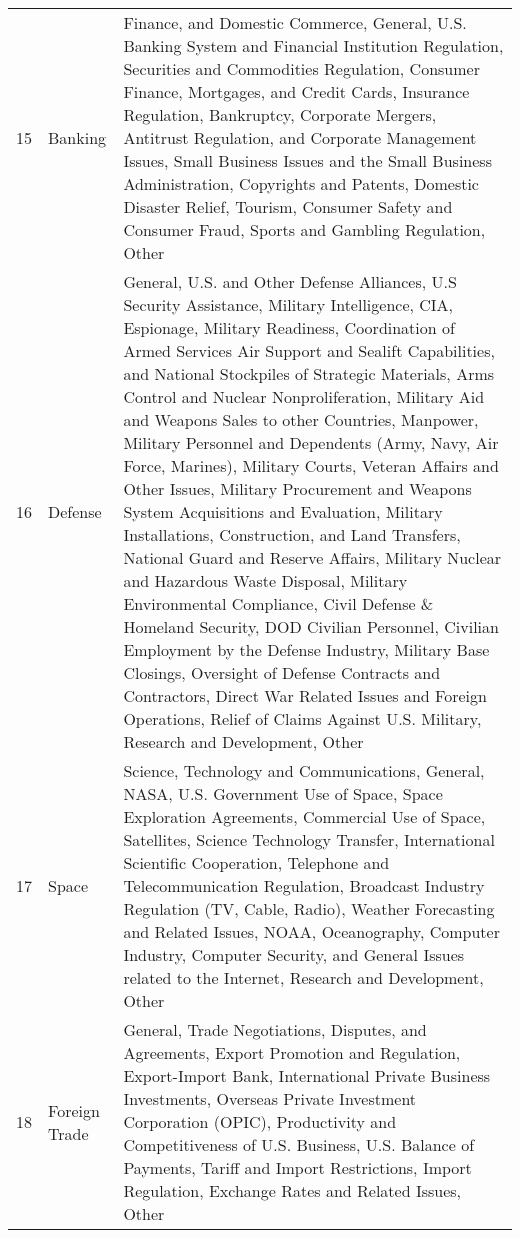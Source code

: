{\begin{longtable}{p{}p{}p{}}
  15 & Banking & Finance, and Domestic Commerce, General, U.S. Banking System and Financial Institution Regulation, Securities and Commodities Regulation, Consumer Finance, Mortgages, and Credit Cards, Insurance Regulation, Bankruptcy, Corporate Mergers, Antitrust Regulation, and Corporate Management Issues, Small Business Issues and the Small Business Administration, Copyrights and Patents, Domestic Disaster Relief, Tourism, Consumer Safety and Consumer Fraud, Sports and Gambling Regulation, Other \\ 
  16 & Defense & General, U.S. and Other Defense Alliances, U.S Security Assistance, Military Intelligence, CIA, Espionage, Military Readiness, Coordination of Armed Services Air Support and Sealift Capabilities, and National Stockpiles of Strategic Materials, Arms Control and Nuclear Nonproliferation, Military Aid and Weapons Sales to other Countries, Manpower, Military Personnel and Dependents (Army, Navy, Air Force, Marines), Military Courts, Veteran Affairs and Other Issues, Military Procurement and Weapons System Acquisitions and Evaluation, Military Installations, Construction, and Land Transfers, National Guard and Reserve Affairs, Military Nuclear and Hazardous Waste Disposal, Military Environmental Compliance, Civil Defense \& Homeland Security, DOD Civilian Personnel, Civilian Employment by the Defense Industry, Military Base Closings, Oversight of Defense Contracts and Contractors, Direct War Related Issues and Foreign Operations, Relief of Claims Against U.S. Military, Research and Development, Other \\ 
  17 & Space & Science, Technology and Communications, General, NASA, U.S. Government Use of Space, Space Exploration Agreements, Commercial Use of Space, Satellites, Science Technology Transfer, International Scientific Cooperation, Telephone and Telecommunication Regulation, Broadcast Industry Regulation (TV, Cable, Radio), Weather Forecasting and Related Issues, NOAA, Oceanography, Computer Industry, Computer Security, and General Issues related to the Internet, Research and Development, Other \\ 
  18 & Foreign Trade & General, Trade Negotiations, Disputes, and Agreements, Export Promotion and Regulation, Export-Import Bank, International Private Business Investments, Overseas Private Investment Corporation (OPIC), Productivity and Competitiveness of U.S. Business, U.S. Balance of Payments, Tariff and Import Restrictions, Import Regulation, Exchange Rates and Related Issues, Other \\ 

\end{longtable}}

